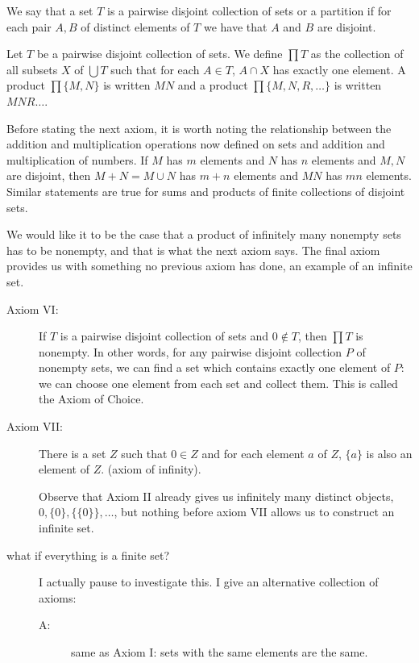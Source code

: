 \documentclass[12pt]{article}
\begin{document}
\begin{enumerate}
We say that a set $T$ is a pairwise disjoint collection of sets or a partition if for each pair $A,B$ of distinct elements of $T$ we have that $A$ and $B$ are disjoint.

Let $T$ be a pairwise disjoint collection of sets.  We define $\prod T$ as the collection of all subsets $X$ of $\bigcup T$ such that for each $A \in T$, $A\cap X$ has exactly one element.
A product $\prod\{M,N\}$ is written $MN$ and a product $\prod\{M,N,R,\ldots\}$ is written $MNR\ldots$.

Before stating the next axiom, it is worth noting the relationship between the addition and multiplication operations now defined on sets and addition and multiplication of numbers.
If $M$ has $m$ elements and $N$ has $n$ elements and $M,N$ are disjoint, then $M+N = M \cup N$ has $m+n$ elements and $MN$ has $mn$ elements.  Similar statements are true for sums and products of finite collections of disjoint sets.

We would like it to be the case that a product of infinitely many nonempty sets has to be nonempty, and that is what the next axiom says.  The final axiom provides us with something no previous axiom has done, an example of an infinite set.

\begin{description}

\item[Axiom VI:]  If $T$ is a pairwise disjoint collection of sets and $0 \not\in T$, then $\prod T$ is nonempty.  In other words, for any pairwise disjoint collection $P$ of nonempty sets, we can find a set which contains exactly one element of $P$:  we can choose one element from each set and collect them.  This is called the Axiom of Choice.

\item[Axiom VII:]  There is a set $Z$ such that $0 \in Z$ and for each element $a$ of $Z$, $\{a\}$ is also an element of $Z$. (axiom of infinity).

Observe that Axiom II already gives us infinitely many distinct objects, $0, \{0\}, \{\{0\}\},\ldots$, but nothing before axiom VII allows us to construct an infinite set.

\item[what if everything is a finite set?]  I actually pause to investigate this.  I give an alternative collection of axioms:

\begin{description}

\item[A:]  same as Axiom I:  sets with the same elements are the same.


\end{description}
\end{description}
\end{enumerate}
\end{document}
